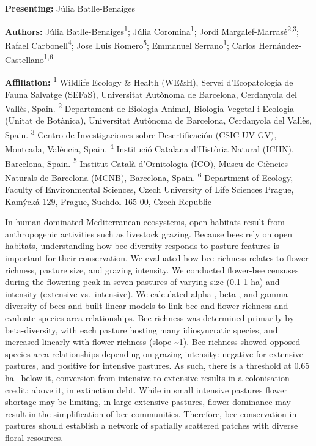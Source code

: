 \documentclass[
  letterpaper,
  DIV=11,
  numbers=noendperiod]{scrartcl}
\begin{document}
\textbf{Presenting:} Júlia Batlle-Benaiges

\textbf{Authors:} Júlia Batlle-Benaiges\textsuperscript{1}; Júlia
Coromina\textsuperscript{1}; Jordi
Margalef-Marrasé\textsuperscript{2,3}; Rafael
Carbonell\textsuperscript{4}; Jose Luis Romero\textsuperscript{5};
Emmanuel Serrano\textsuperscript{1}; Carlos
Hernández-Castellano\textsuperscript{1,6}

\textbf{Affiliation:} \textsuperscript{1} Wildlife Ecology \& Health
(WE\&H), Servei d'Ecopatologia de Fauna Salvatge (SEFaS), Universitat
Autònoma de Barcelona, Cerdanyola del Vallès, Spain. \textsuperscript{2}
Departament de Biologia Animal, Biologia Vegetal i Ecologia (Unitat de
Botànica), Universitat Autònoma de Barcelona, Cerdanyola del Vallès,
Spain. \textsuperscript{3} Centro de Investigaciones sobre
Desertificación (CSIC-UV-GV), Montcada, València, Spain.
\textsuperscript{4} Institució Catalana d'Història Natural (ICHN),
Barcelona, Spain. \textsuperscript{5} Institut Català d'Ornitologia
(ICO), Museu de Ciències Naturals de Barcelona (MCNB), Barcelona, Spain.
\textsuperscript{6} Department of Ecology, Faculty of Environmental
Sciences, Czech University of Life Sciences Prague, Kamýcká 129, Prague,
Suchdol 165 00, Czech Republic

In human-dominated Mediterranean ecosystems, open habitats result from
anthropogenic activities such as livestock grazing. Because bees rely on
open habitats, understanding how bee diversity responds to pasture
features is important for their conservation. We evaluated how bee
richness relates to flower richness, pasture size, and grazing
intensity. We conducted flower-bee censuses during the flowering peak in
seven pastures of varying size (0.1-1 ha) and intensity (extensive
vs.~intensive). We calculated alpha-, beta-, and gamma-diversity of bees
and built linear models to link bee and flower richness and evaluate
species-area relationships. Bee richness was determined primarily by
beta-diversity, with each pasture hosting many idiosyncratic species,
and increased linearly with flower richness (slope \textasciitilde1).
Bee richness showed opposed species-area relationships depending on
grazing intensity: negative for extensive pastures, and positive for
intensive pastures. As such, there is a threshold at 0.65 ha --below it,
conversion from intensive to extensive results in a colonisation credit;
above it, in extinction debt. While in small intensive pastures flower
shortage may be limiting, in large extensive pastures, flower dominance
may result in the simplification of bee communities. Therefore, bee
conservation in pastures should establish a network of spatially
scattered patches with diverse floral resources.
\end{document}
